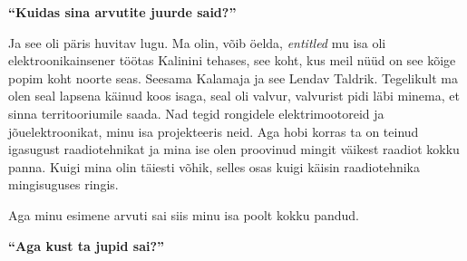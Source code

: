 
\textbf{\enquote{Kuidas sina arvutite juurde said?}}

Ja see oli päris huvitav lugu. Ma olin, võib öelda, \emph{entitled} mu isa oli
elektroonikainsener töötas Kalinini tehases, see koht, kus meil nüüd on
see kõige popim koht noorte seas. Seesama Kalamaja ja see Lendav Taldrik.
Tegelikult ma olen seal lapsena käinud koos isaga, seal oli valvur, valvurist
pidi läbi minema, et sinna territooriumile saada. Nad tegid rongidele
elektrimootoreid ja jõuelektroonikat, minu isa projekteeris neid. Aga
hobi korras ta on teinud igasugust raadiotehnikat ja mina ise olen proovinud
mingit väikest raadiot kokku panna. Kuigi mina olin täiesti võhik, selles osas kuigi
käisin raadiotehnika mingisuguses ringis.

Aga minu esimene arvuti sai siis minu isa poolt kokku pandud.

\textbf{\enquote{Aga kust ta jupid sai?}}

